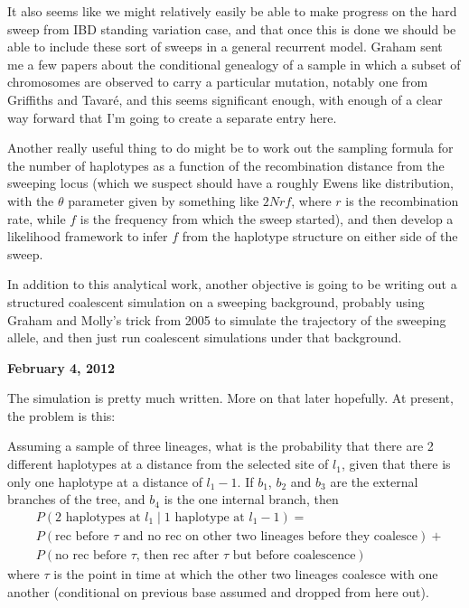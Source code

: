 \documentclass[reqno]{amsart}
\begin{document}
It also seems like we might relatively easily be able to make progress on the hard sweep from IBD standing variation case, and that once this is done we should be able to include these sort of sweeps in a general recurrent model. Graham sent me a few papers about the conditional genealogy of a sample in which a subset of chromosomes are observed to carry a particular mutation, notably one from Griffiths and Tavar{\'e}\cite{GriffithsTavare:2003}, and this seems significant enough, with enough of a clear way forward that I'm going to create a separate entry here.

Another really useful thing to do might be to work out the sampling formula for the number of haplotypes as a function of the recombination distance from the sweeping locus (which we suspect should have a roughly Ewens like distribution, with the $\theta$ parameter given by something like $2Nrf$, where $r$ is the recombination rate, while $f$ is the frequency from which the sweep started), and then develop a likelihood framework to infer $f$ from the haplotype structure on either side of the sweep.

In addition to this analytical work, another objective is going to be writing out a structured coalescent simulation on a sweeping background, probably using Graham and Molly's trick from 2005\cite{Przeworski2005} to simulate the trajectory of the sweeping allele, and then just run coalescent simulations under that background.

\begin{flushright}
	\textbf{February 4, 2012}
\end{flushright}

The simulation is pretty much written. More on that later hopefully. At present, the problem is this: 

Assuming a sample of three lineages, what is the probability that there are 2 different haplotypes at a distance from the selected site of $l_1$, given that there is only one haplotype at a distance of $l_1-1$. If $b_1$, $b_2$ and $b_3$ are the external branches of the tree, and $b_4$ is the one internal branch, then
\begin{align}
	& P(\text{2 haplotypes at } l_1 \mid  \text{1 haplotype at } l_1-1) = \\
	& P(\text{rec before } \tau \text{ and no rec on other two lineages before they coalesce}) + \\
	& P(\text{no rec before }\tau \text{, then rec after } \tau \text{ but before coalescence})
\end{align}
where $\tau$ is the point in time at which the other two lineages coalesce with one another (conditional on previous base assumed and dropped from here out).
\end{document}

